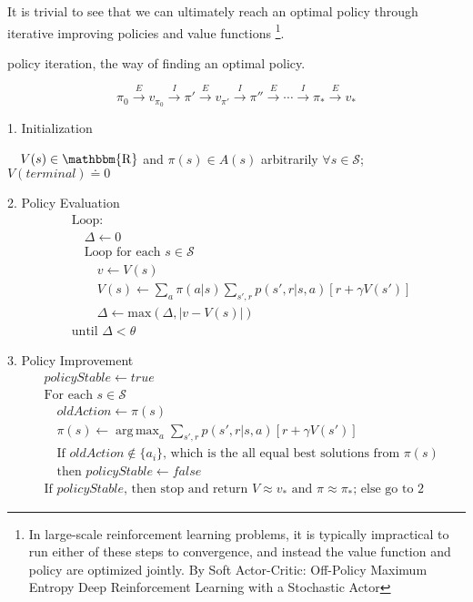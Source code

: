 \documentclass[lang=en,mode=geye,device=normal,color=blue,14pt]{elegantnote}
\DeclareMathOperator*{\1}{\mathbbm{1}}
\DeclareMathOperator*{\R}{\mathbbm{R}}
\DeclareMathOperator*{\argmax}{arg\,max}
\begin{document}
It is trivial to see that we can ultimately reach an optimal policy through iterative improving policies and value functions \footnote{In large-scale reinforcement learning problems, it is typically impractical to run either of these steps to convergence, and instead the value function and policy are optimized jointly. By Soft Actor-Critic: Off-Policy Maximum Entropy Deep Reinforcement Learning with a Stochastic Actor}.

\begin{definition}
policy iteration, the way of finding an optimal policy.

$$\pi_0 \xrightarrow{E} v_{\pi_0} \xrightarrow{I} \pi' \xrightarrow{E} v_{\pi'} \xrightarrow{I} \pi'' \xrightarrow{E} \cdots \xrightarrow{I} \pi_* \xrightarrow{E} v_* $$
\end{definition}

\begin{tcolorbox}[width=\textwidth,title={Policy Iteration (using iterative policy evaluation) for estimating $\pi \approx \pi_*$}]
1. Initialization

$\quad V(s) \in\R$ and $\pi(s) \in A(s)$ arbitrarily $\forall s \in \mathcal{S}$; $V(terminal) \doteq 0$

2. Policy Evaluation
\begin{align*}
&\text{Loop:}\\
&\quad\Delta \leftarrow 0\\
&\quad\text{Loop for each } s \in \mathcal{S}\\
&\quad\quad v \leftarrow V(s)\\
&\quad\quad V(s) \leftarrow \sum_a \pi (a|s) \sum_{s',r} p(s',r|s,a)[r + \gamma V(s')]\\
&\quad\quad \Delta \leftarrow \text{max}(\Delta, |v-V(s)|)\\
&\text{until } \Delta < \theta
\end{align*}

3. Policy Improvement
\begin{align*}
&policyStable \leftarrow true\\
&\text{For each } s \in \mathcal{S}\\
&\quad oldAction \leftarrow \pi(s)\\
&\quad \pi(s) \leftarrow \argmax_a \sum_{s',r} p(s',r|s,a)[r+\gamma V(s')]\\
&\quad \text{If } oldAction \notin \{a_i\} \text{, which is the all equal best solutions from $\pi(s)$}\\
& \quad \text{then } policyStable \leftarrow false\\
&\text{If } policyStable \text{, then stop and return } V \approx v_* \text{ and } \pi \approx \pi_*\text{; else go to 2}	
\end{align*}
\end{tcolorbox}
\end{document}
